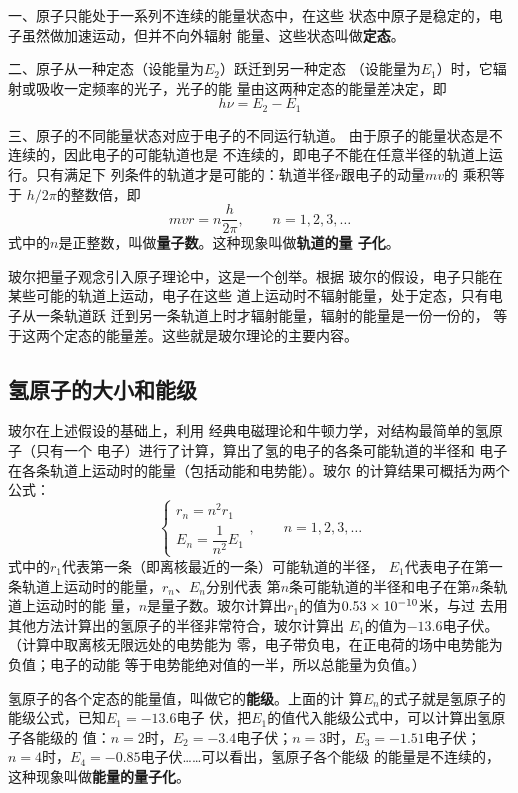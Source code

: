 一、原子只能处于一系列不连续的能量状态中，在这些
状态中原子是稳定的，电子虽然做加速运动，但并不向外辐射
能量、这些状态叫做\textbf{定态}。

二、原子从一种定态（设能量为$E_2$）跃迁到另一种定态
（设能量为$E_1$）时，它辐射或吸收一定频率的光子，光子的能
量由这两种定态的能量差决定，即
\[h\nu=E_2-E_1\]

三、原子的不同能量状态对应于电子的不同运行轨道。
由于原子的能量状态是不连续的，因此电子的可能轨道也是
不连续的，即电子不能在任意半径的轨道上运行。只有满足下
列条件的轨道才是可能的：轨道半径$r$跟电子的动量$mv$的
乘积等于 $h/2\pi$的整数倍，即
\[mvr=n\frac{h}{2\pi},\qquad n=1,2,3,\ldots\]
式中的$n$是正整数，叫做\textbf{量子数}。这种现象叫做\textbf{轨道的量
子化}。

玻尔把量子观念引入原子理论中，这是一个创举。根据
玻尔的假设，电子只能在某些可能的轨道上运动，电子在这些
道上运动时不辐射能量，处于定态，只有电子从一条轨道跃
迁到另一条轨道上时才辐射能量，辐射的能量是一份一份的，
等于这两个定态的能量差。这些就是玻尔理论的主要内容。

\subsection{氢原子的大小和能级}

玻尔在上述假设的基础上，利用
经典电磁理论和牛顿力学，对结构最简单的氢原子（只有一个
电子）进行了计算，算出了氢的电子的各条可能轨道的半径和
电子在各条轨道上运动时的能量（包括动能和电势能）。玻尔
的计算结果可概括为两个公式：
\[\begin{cases}
    r_n=n^2 r_1\\
    E_n=\dfrac{1}{n^2}E_1
\end{cases},\qquad n=1,2,3,\ldots\]
式中的$r_1$代表第一条（即离核最近的一条）可能轨道的半径，
$E_1$代表电子在第一条轨道上运动时的能量，$r_n$、$E_n$分别代表
第$n$条可能轨道的半径和电子在第$n$条轨道上运动时的能
量，$n$是量子数。玻尔计算出$r_1$的值为$0.53\times10^{-10}$米，与过
去用其他方法计算出的氢原子的半径非常符合，玻尔计算出
$E_1$的值为$-13.6$电子伏。（计算中取离核无限远处的电势能为
零，电子带负电，在正电荷的场中电势能为负值；电子的动能
等于电势能绝对值的一半，所以总能量为负值。）

氢原子的各个定态的能量值，叫做它的\textbf{能级}。上面的计
算$E_n$的式子就是氢原子的能级公式，已知$E_1=-13.6$电子
伏，把$E_1$的值代入能级公式中，可以计算出氢原子各能级的
值：$n=2$时，$E_2=-3.4$电子伏；$n=3$时，$E_3=-1.51$电子伏；
$n=4$时，$E_4=-0.85$电子伏……可以看出，氢原子各个能级
的能量是不连续的，这种现象叫做\textbf{能量的量子化}。

